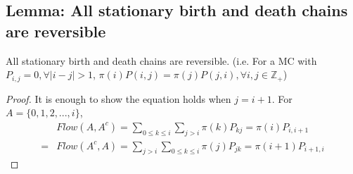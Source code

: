\documentclass[11pt]{elegantbook}
\begin{document}
\subsection{Lemma: All stationary birth and death chains are reversible}
\begin{lemma}
    All stationary birth and death chains are reversible. (i.e. For a MC with $P_{i,j}=0,\forall |i-j|>1$, $\pi(i)P(i,j)=\pi(j)P(j,i),\forall i,j\in \mathbb{Z}_+$)
\end{lemma}
\begin{proof}
    It is enough to show the equation holds when $j = i + 1$. For $A=\{0,1,2,...,i\}$,
    \begin{equation}
        \begin{aligned}
            &Flow(A,A^c)=\sum_{0\leq k\leq i}\sum_{j>i}\pi(k)P_{kj}=\pi(i)P_{i,i+1}\\
            =&Flow(A^c,A)=\sum_{j>i}\sum_{0\leq k\leq i}\pi(j)P_{jk}=\pi(i+1)P_{i+1,i}
        \end{aligned}
        \nonumber
    \end{equation}
\end{proof}
\end{document}
